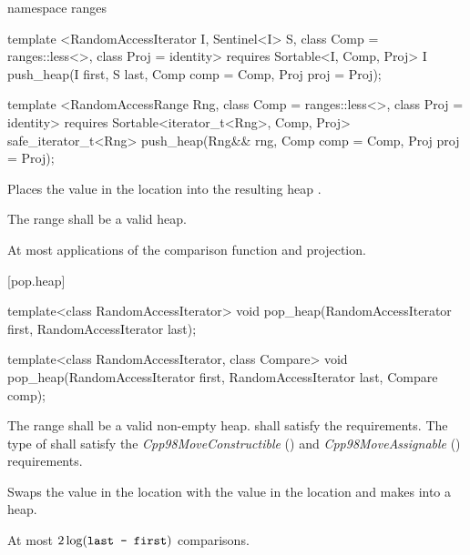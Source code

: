 \begin{addedblock}
%
\begin{itemdecl}
namespace ranges {
  template <RandomAccessIterator I, Sentinel<I> S, class Comp = ranges::less<>,
            class Proj = identity>
      requires Sortable<I, Comp, Proj>
    I push_heap(I first, S last, Comp comp = Comp{}, Proj proj = Proj{});

  template <RandomAccessRange Rng, class Comp = ranges::less<>, class Proj = identity>
      requires Sortable<iterator_t<Rng>, Comp, Proj>
    safe_iterator_t<Rng> push_heap(Rng&& rng, Comp comp = Comp{}, Proj proj = Proj{});
}
\end{itemdecl}

\begin{itemdescr}
\pnum
\effects
Places the value in the location
into the resulting heap
.

\pnum
\requires
The range
shall be a valid heap.

\pnum
\returns {}

\pnum
\complexity
At most
applications of the comparison function and projection.
\end{itemdescr}
\end{addedblock}

[pop.heap]{}

%
\begin{itemdecl}
template<class RandomAccessIterator>
  void pop_heap(RandomAccessIterator first, RandomAccessIterator last);

template<class RandomAccessIterator, class Compare>
  void pop_heap(RandomAccessIterator first, RandomAccessIterator last,
                Compare comp);
\end{itemdecl}

\begin{itemdescr}
\pnum
\requires
The range
shall be a valid non-empty heap.
 shall satisfy the
 requirements. The type
of  shall satisfy the
\textit{Cpp98MoveConstructible} () and
\textit{Cpp98MoveAssignable} () requirements.

\pnum
\effects
Swaps the value in the location 
with the value in the location
and makes
into a heap.

\pnum
\complexity
At most
$2 \log(\texttt{last - first})$
comparisons.
\end{itemdescr}

